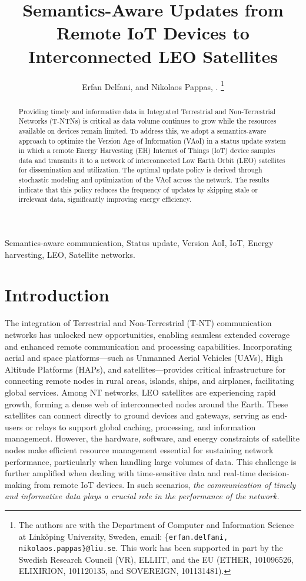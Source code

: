 \documentclass[lettersize,journal]{IEEEtran}
\title{\huge Semantics-Aware Updates from Remote IoT Devices to Interconnected LEO Satellites}
\author{Erfan Delfani, and Nikolaos Pappas, 
		\IEEEmembership{Senior Member, IEEE}.
		\thanks{The authors are with the Department of Computer and Information Science at Linköping University, Sweden, email: \{\texttt{erfan.delfani, nikolaos.pappas\}@liu.se}. This work has been supported in part by the Swedish Research Council (VR), ELLIIT, and the EU (ETHER, 101096526, ELIXIRION, 101120135, and SOVEREIGN, 101131481).}}
\begin{document}
	
	\maketitle
	
	\begin{abstract}
       Providing timely and informative data in Integrated Terrestrial and Non-Terrestrial Networks (T-NTNs) is critical as data volume continues to grow while the resources available on devices remain limited. To address this, we adopt a semantics-aware approach to optimize the Version Age of Information (VAoI) in a status update system in which a remote Energy Harvesting (EH) Internet of Things (IoT) device samples data and transmits it to a network of interconnected Low Earth Orbit (LEO) satellites for dissemination and utilization. The optimal update policy is derived through stochastic modeling and optimization of the VAoI across the network. The results indicate that this policy reduces the frequency of updates by skipping stale or irrelevant data, significantly improving energy efficiency.
    \end{abstract}

    \begin{IEEEkeywords}
    Semantics-aware communication, Status update, Version AoI, IoT, Energy harvesting, LEO, Satellite networks.
    \end{IEEEkeywords}

    
    
	\section{Introduction}

    The integration of Terrestrial and Non-Terrestrial (T-NT) communication networks has unlocked new opportunities, enabling seamless extended coverage and enhanced remote communication and processing capabilities. Incorporating aerial and space platforms—such as Unmanned Aerial Vehicles (UAVs), High Altitude Platforms (HAPs), and satellites—provides critical infrastructure for connecting remote nodes in rural areas, islands, ships, and airplanes, facilitating global services\cite{ntontinether}. Among NT networks, LEO satellites are experiencing rapid growth, forming a dense web of interconnected nodes around the Earth. These satellites can connect directly to ground devices and gateways, serving as end-users or relays to support global caching, processing, and information management. However, the hardware, software, and energy constraints of satellite nodes make efficient resource management essential for sustaining network performance, particularly when handling large volumes of data. This challenge is further amplified when dealing with time-sensitive data and real-time decision-making from remote IoT devices. In such scenarios, \emph{the communication of timely and informative data plays a crucial role in the performance of the network.}  
\end{document}
